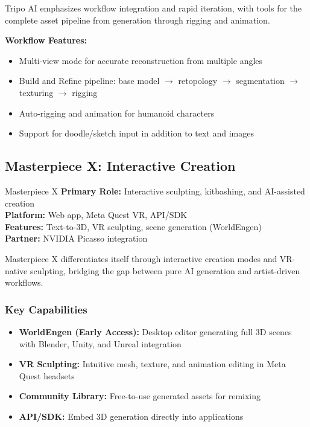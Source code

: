 \documentclass[11pt]{article}
\begin{document}
Tripo AI emphasizes workflow integration and rapid iteration, with tools for the complete asset pipeline from generation through rigging and animation.

\textbf{Workflow Features:}
\begin{itemize}[leftmargin=2em]
  \item Multi-view mode for accurate reconstruction from multiple angles
  \item Build and Refine pipeline: base model $\rightarrow$ retopology $\rightarrow$ segmentation $\rightarrow$ texturing $\rightarrow$ rigging
  \item Auto-rigging and animation for humanoid characters
  \item Support for doodle/sketch input in addition to text and images
\end{itemize}

\subsection{Masterpiece X: Interactive Creation}

\begin{toolbox}{Masterpiece X}
\textbf{Primary Role:} Interactive sculpting, kitbashing, and AI-assisted creation\\
\textbf{Platform:} Web app, Meta Quest VR, API/SDK\\
\textbf{Features:} Text-to-3D, VR sculpting, scene generation (WorldEngen)\\
\textbf{Partner:} NVIDIA Picasso integration
\end{toolbox}

Masterpiece X differentiates itself through interactive creation modes and VR-native sculpting, bridging the gap between pure AI generation and artist-driven workflows.

\subsubsection{Key Capabilities}

\begin{itemize}[leftmargin=2em]
  \item \textbf{WorldEngen (Early Access):} Desktop editor generating full 3D scenes with Blender, Unity, and Unreal integration
  \item \textbf{VR Sculpting:} Intuitive mesh, texture, and animation editing in Meta Quest headsets
  \item \textbf{Community Library:} Free-to-use generated assets for remixing
  \item \textbf{API/SDK:} Embed 3D generation directly into applications
\end{itemize}
\end{document}
